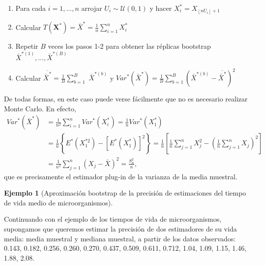 \documentclass[
]{book}
\theoremstyle{break}
\theoremstyle{definition}
\theoremstyle{definition}
\newtheorem{example}{Ejemplo}[chapter]
\theoremstyle{definition}
\theoremstyle{remark}
\begin{document}
\begin{enumerate}
\def\labelenumi{\arabic{enumi}.}
\item
  Para cada \(i=1,\ldots ,n\) arrojar \(U_i\sim \mathcal{U}\left( 0,1 \right)\) y
  hacer \(X_i^{\ast}=X_{\left\lfloor nU_i\right\rfloor +1}\)
\item
  Calcular
  \(T\left( \mathbf{X}^{\ast} \right) =\bar{X}^{\ast}= \frac{1}{n}\sum_{i=1}^{n}X_i^{\ast}\)
\item
  Repetir \(B\) veces los pasos 1-2 para obtener las réplicas bootstrap
  \(\bar{X}^{\ast (1)}, \ldots, \bar{X}^{\ast (B)}\)
\item
  Calcular \(\overline{\bar{X}^{\ast}}=\frac{1}{B}\sum_{b=1}^{B}\)
  \(\bar{X}^{\ast (b)}\) y
  \(Var^{\ast}\left( \bar{X}^{\ast} \right) =\frac{1}{B} \sum_{b=1}^{B}\left( \bar{X}^{\ast (b)}-\overline{\bar{X}^{\ast}} \right)^2\)
\end{enumerate}

De todas formas, en este caso puede verse fácilmente que no es necesario
realizar Monte Carlo. En efecto,
\[\begin{aligned}
Var^{\ast}\left( \bar{X}^{\ast} \right) & = \frac{1}{n^2}
\sum_{i=1}^{n}Var^{\ast}\left( X_i^{\ast} \right) =\frac{1}{n}Var^{\ast}\left( X_1^{\ast} \right) \\
& = \frac{1}{n}\left\{ E^{\ast}\left( X_1^{\ast 2} \right) -
\left[ E^{\ast}\left( X_1^{\ast} \right) \right]^2\right\} =\frac{1}{n}\left[ 
\frac{1}{n}\sum_{j=1}^{n}X_j^2-\left( \frac{1}{n}\sum_{j=1}^{n}X_j \right)^2 \right] \\
& = \frac{1}{n^2}\sum_{j=1}^{n}\left( X_j-\bar{X} \right)^2=\frac{S_n^2}{n},
\end{aligned}\]
que es precisamente el estimador
plug-in de la varianza de la media muestral.

\begin{example}[Aproximación bootstrap de la precisión de estimaciones del tiempo de vida medio de microorganismos]
\protect\hypertarget{exm:estimacion-boot-precision}{}{\label{exm:estimacion-boot-precision} \iffalse (Aproximación bootstrap de la precisión de estimaciones del tiempo de vida medio de microorganismos) \fi{} } \vspace{0.5cm}

Continuando con el ejemplo de los tiempos de vida de microorganismos,
supongamos que queremos estimar
la precisión de dos estimadores de su vida media: media muestral y
mediana muestral, a partir de los datos observados: 0.143, 0.182, 0.256, 0.260, 0.270,
0.437, 0.509, 0.611, 0.712, 1.04, 1.09, 1.15, 1.46, 1.88, 2.08.
\end{example}
\end{document}
